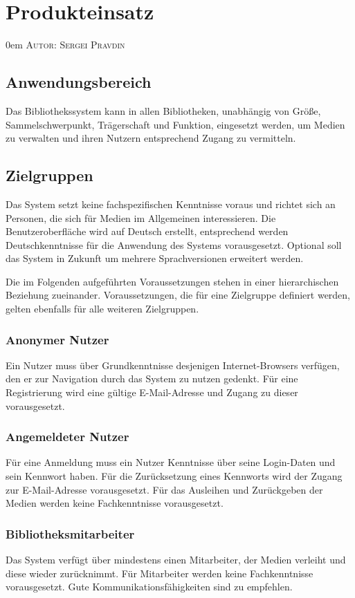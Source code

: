 \documentclass{article}
\makeatletter
\newcommand{\sectionauthor}[1]{
	{\parindent 0em \large \scshape Autor: #1 \par \nobreak \vspace*{2em}}
	\@afterheading
}
\makeatother
\begin{document}
\section{Produkteinsatz} %
\sectionauthor{Sergei Pravdin}
\subsection{Anwendungsbereich}
Das Bibliothekssystem kann in allen Bibliotheken, unabhängig von Größe, Sammelschwerpunkt, Trägerschaft und Funktion, eingesetzt werden, um Medien zu verwalten und ihren Nutzern entsprechend Zugang zu vermitteln.
\subsection{Zielgruppen}
Das System setzt keine fachspezifischen Kenntnisse voraus und richtet sich an Personen, die sich für Medien im Allgemeinen interessieren. Die Benutzeroberfläche wird auf Deutsch erstellt, entsprechend werden Deutschkenntnisse für die Anwendung des Systems vorausgesetzt. Optional soll das System in Zukunft um mehrere Sprachversionen erweitert werden. \vspace{0.5em}

Die im Folgenden aufgeführten Voraussetzungen stehen in einer hierarchischen Beziehung zueinander. Voraussetzungen, die für eine Zielgruppe definiert werden, gelten ebenfalls für alle weiteren Zielgruppen.
\subsubsection{Anonymer Nutzer}
Ein Nutzer muss über Grundkenntnisse desjenigen Internet-Browsers verfügen, den er zur Navigation durch das System zu nutzen gedenkt. Für eine Registrierung wird eine gültige E-Mail-Adresse und Zugang zu dieser vorausgesetzt.
\subsubsection{Angemeldeter Nutzer}
Für eine Anmeldung muss ein Nutzer Kenntnisse über seine Login-Daten und sein Kennwort haben. Für die Zurücksetzung eines Kennworts wird der Zugang zur E-Mail-Adresse vorausgesetzt. Für das Ausleihen und Zurückgeben der Medien werden keine Fachkenntnisse vorausgesetzt.
\subsubsection{Bibliotheksmitarbeiter}
Das System verfügt über mindestens einen Mitarbeiter, der Medien verleiht und \linebreak diese wieder zurücknimmt. Für Mitarbeiter werden keine Fachkenntnisse vorausgesetzt. Gute Kommunikationsfähigkeiten sind zu empfehlen.
\end{document}
